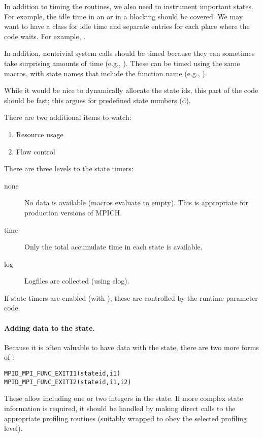 \documentclass{article}
\begin{document}
In addition to timing the routines, we also need to instrument important
states.  For example, the idle time in an  or in a blocking
 should be covered.  We may want to have a class for idle time
and separate entries for each place where the code waits.  For example,
.  

In addition, nontrivial system calls should be timed because they can
sometimes take surprising amounts of time (e.g., ).
These can be timed using the same macros, with state names that include the
function name (e.g., ).

While it would be nice to dynamically allocate the state ids, this part of the
code should be fast; this argues for predefined state numbers
(d).  

There are two additional items to watch:
\begin{enumerate}
\item Resource usage
\item Flow control
\end{enumerate}

There are three levels to the state timers:
\begin{description}
\item[none]No data is available (macros evaluate to empty).  This is
  appropriate for production versions of MPICH.
\item[time]Only the total accumulate time in each state is available.
\item[log]Logfiles are collected (using slog).
\end{description}
If state timers are enabled (with ), these are
controlled by the runtime parameter code.

\paragraph{Adding data to the state.}
Because it is often valuable to have data with the state, there are
two more forms of :
\begin{verbatim}
MPID_MPI_FUNC_EXITI1(stateid,i1)
MPID_MPI_FUNC_EXITI2(stateid,i1,i2)
\end{verbatim}
These allow including one or two integers in the state.  If more
complex state information is required, it should be handled by making
direct calls to the appropriate profiling routines (suitably wrapped
to obey the selected profiling level).
\end{document}
